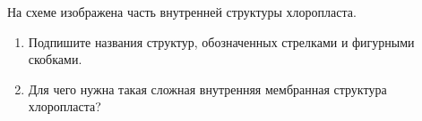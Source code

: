 
На схеме изображена часть внутренней структуры хлоропласта.


\begin{enumerate}
    \item Подпишите названия структур, обозначенных стрелками и фигурными скобками.
    \item Для чего нужна такая сложная внутренняя мембранная структура хлоропласта?
\end{enumerate}